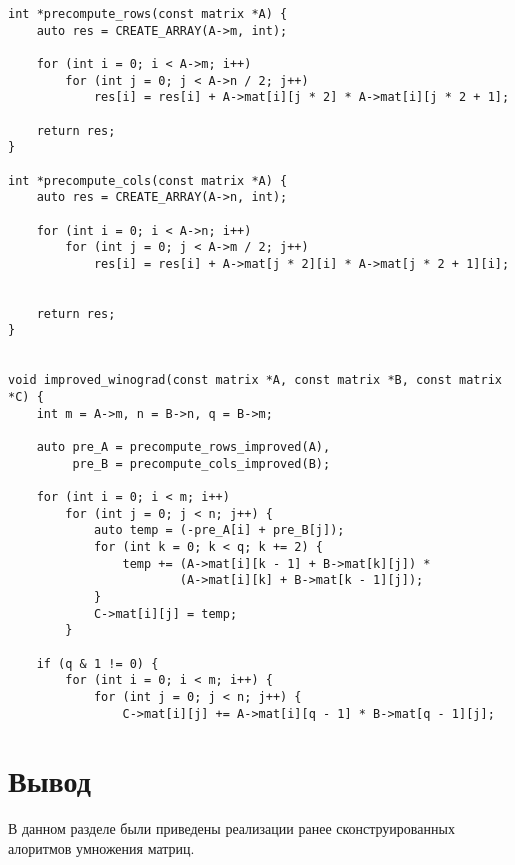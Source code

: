 \begin{lstlisting}[caption=Реализация улучшенного алгоритма Копперсмита--Виноград, label=lst:winograd_improved]
int *precompute_rows(const matrix *A) {
    auto res = CREATE_ARRAY(A->m, int);

    for (int i = 0; i < A->m; i++)
        for (int j = 0; j < A->n / 2; j++)
            res[i] = res[i] + A->mat[i][j * 2] * A->mat[i][j * 2 + 1];

    return res;
}

int *precompute_cols(const matrix *A) {
    auto res = CREATE_ARRAY(A->n, int);

    for (int i = 0; i < A->n; i++)
        for (int j = 0; j < A->m / 2; j++)
            res[i] = res[i] + A->mat[j * 2][i] * A->mat[j * 2 + 1][i];


    return res;
}


void improved_winograd(const matrix *A, const matrix *B, const matrix *C) {
    int m = A->m, n = B->n, q = B->m;

    auto pre_A = precompute_rows_improved(A),
         pre_B = precompute_cols_improved(B);

    for (int i = 0; i < m; i++)
        for (int j = 0; j < n; j++) {
            auto temp = (-pre_A[i] + pre_B[j]);
            for (int k = 0; k < q; k += 2) {
                temp += (A->mat[i][k - 1] + B->mat[k][j]) *
                        (A->mat[i][k] + B->mat[k - 1][j]);
            }
            C->mat[i][j] = temp;
        }

    if (q & 1 != 0) {
        for (int i = 0; i < m; i++) {
            for (int j = 0; j < n; j++) {
                C->mat[i][j] += A->mat[i][q - 1] * B->mat[q - 1][j];
\end{lstlisting}

\section{Вывод}
В данном разделе были приведены реализации ранее сконструированных алоритмов умножения матриц.

